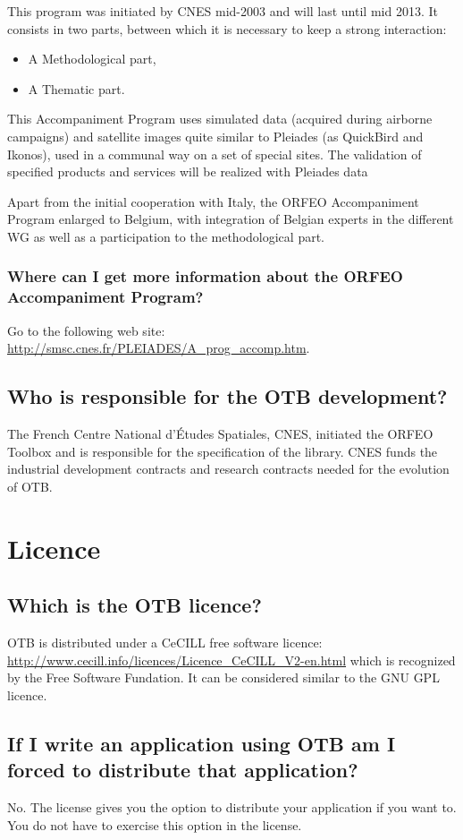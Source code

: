 This program was initiated by CNES mid-2003 and will last until mid 2013.
It consists in two parts, between which it is necessary to keep a strong interaction:
\begin{itemize}
\item A Methodological part,
\item A Thematic part.
\end{itemize}

This Accompaniment Program uses simulated data (acquired during airborne campaigns) and satellite images quite similar to Pleiades (as QuickBird and Ikonos), used in a communal way on a set of special sites. The validation of specified products and services will be realized with Pleiades data

Apart from the initial cooperation with Italy, the ORFEO Accompaniment
Program enlarged to Belgium, with integration of Belgian experts in
the different WG as well as a participation to the methodological
part.

\subsubsection{Where can I get more information about the ORFEO
  Accompaniment Program?}
Go to the following web site:
\url{http://smsc.cnes.fr/PLEIADES/A_prog_accomp.htm}.

\subsection{Who is responsible for the OTB development?}
The French Centre National d'\'Etudes Spatiales, CNES, initiated the ORFEO
Toolbox and is responsible for the specification of the library. CNES
funds the industrial development contracts and research contracts
needed for the evolution of OTB.

\section{Licence}
\subsection{Which is the OTB licence?}
OTB is distributed under a CeCILL free software licence:\\
\url{http://www.cecill.info/licences/Licence_CeCILL_V2-en.html} which 
is recognized by the Free Software Fundation. It can be considered 
similar to the GNU GPL licence. 

\subsection{If I write an application using OTB am I forced to distribute that application?}
No. The license gives you the option to distribute your application if
you want to. You do not have to exercise this option in the license.

